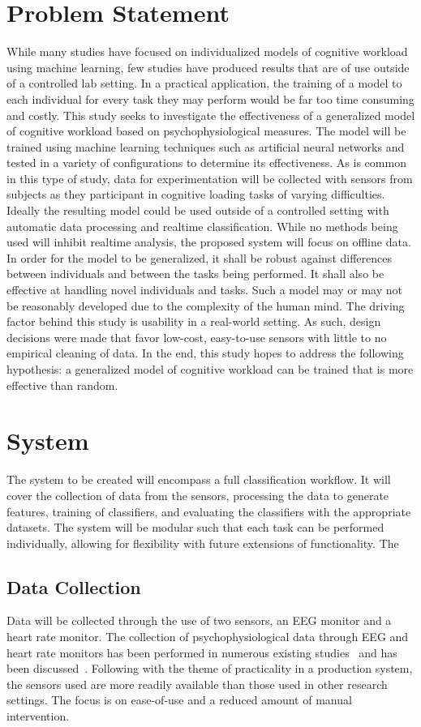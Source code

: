 \documentclass[11pt]{article}
\begin{document}
\section{Problem Statement}
While many studies have focused on individualized models of cognitive workload using machine learning, few studies have produced results that are of use outside of a controlled lab setting. In a practical application, the training of a model to each individual for every task they may perform would be far too time consuming and costly. This study seeks to investigate the effectiveness of a generalized model of cognitive workload based on psychophysiological measures. The model will be trained using machine learning techniques such as artificial neural networks and tested in a variety of configurations to determine its effectiveness. As is common in this type of study, data for experimentation will be collected with sensors from subjects as they participant in cognitive loading tasks of varying difficulties. Ideally the resulting model could be used outside of a controlled setting with automatic data processing and realtime classification. While no methods being used will inhibit realtime analysis, the proposed system will focus on offline data. In order for the model to be generalized, it shall be robust against differences between individuals and between the tasks being performed. It shall also be effective at handling novel individuals and tasks. Such a model may or may not be reasonably developed due to the complexity of the human mind. The driving factor behind this study is usability in a real-world setting. As such, design decisions were made that favor low-cost, easy-to-use sensors with little to no empirical cleaning of data.  In the end, this study hopes to address the following hypothesis: a generalized model of cognitive workload can be trained that is more effective than random. 

\section{System}
The system to be created will encompass a full classification workflow. It will cover the collection of data from the sensors, processing the data to generate features, training of classifiers, and evaluating the classifiers with the appropriate datasets. The system will be modular such that each task can be performed individually, allowing for flexibility with future extensions of functionality. The  

\subsection{Data Collection}
Data will be collected through the use of two sensors, an EEG monitor and a heart rate monitor. The collection of psychophysiological data through EEG and heart rate monitors has been performed in numerous existing studies~\cite{Wilson, Yang, Wang_Z} and has been discussed~\cite{Sweller}. Following with the theme of practicality in a production system, the sensors used are more readily available than those used in other research settings. The focus is on ease-of-use and a reduced amount of manual intervention.
\end{document}
